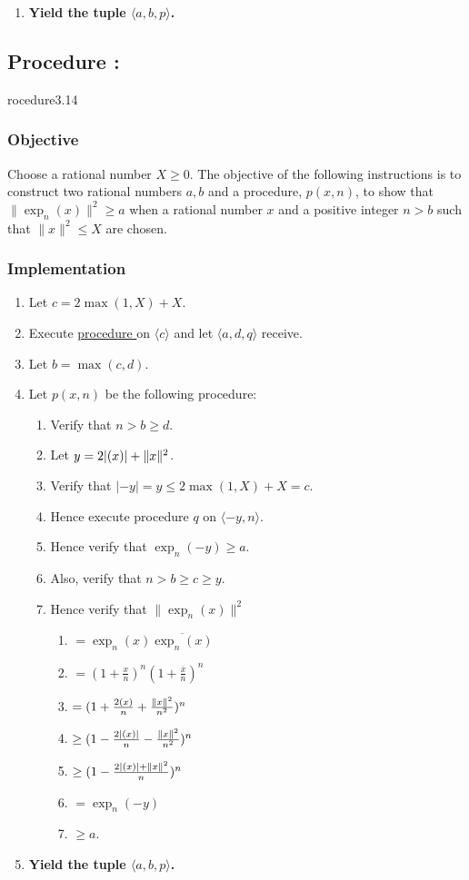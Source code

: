 \documentclass{article}
\let\Re\relax\DeclareMathOperator{\Re}{re}
\newcommand{\conj}[1]{\overline{#1}}
\newcounter{procedure}[part]
\newcommand{\procedure}[1]{\subsection*{Procedure \thepart:\theprocedure}\label{sec:procedure #1}\global\expandafter\edef\csname procedure#1\endcsname{\thepart:\theprocedure}\addtocounter{procedure}{1}}
\newcommand{\objective}{\subsubsection*{Objective}}
\newcommand{\implementation}{\subsubsection*{Implementation}}
\newcommand{\procedurehr}[1]{\hyperref[sec:procedure #1]{procedure \expandafter\csname procedure#1\endcsname}}
\begin{document}
\begin{multicols}{2}
\begin{enumerate}
\begin{enumerate}
					\end{enumerate}
					\item \textbf{Yield the tuple $\langle a,b,p\rangle$.}
				\end{enumerate}
		\procedure{3.14}
			\objective
				Choose a rational number $X\ge 0$. The objective of the following instructions is to construct two rational numbers $a,b$ and a procedure, $p(x,n)$, to show that $\lVert\exp_n(x)\rVert^2\ge a$ when a rational number $x$ and a positive integer $n>b$ such that $\lVert x\rVert^2\le X$ are chosen.
			\implementation
				\begin{enumerate}
					\item Let $c=2\max(1,X)+X$.
					\item Execute \procedurehr{3.12} on $\langle c\rangle$ and let $\langle a,d,q\rangle$ receive.
					\item Let $b=\max(c,d)$.
					\item Let $p(x,n)$ be the following procedure:
					\begin{enumerate}
						\item Verify that $n>b\ge d$.
						\item Let $y=2\lvert\Re(x)\rvert+\lVert x\rVert^2$.
						\item Verify that $\lvert -y\rvert=y\le 2\max(1,X)+X=c$.
						\item Hence execute procedure $q$ on $\langle -y,n\rangle$.
						\item Hence verify that $\exp_n(-y)\ge a$.
						\item Also, verify that $n>b\ge c\ge y$.
						\item Hence verify that $\lVert\exp_n(x)\rVert^2$
						\begin{enumerate}
							\item $=\exp_n(x)\conj{\exp_n(x)}$
							\item $=(1+\frac{x}{n})^n(1+\frac{\conj{x}}{n})^n$
							\item $=(1+\frac{2\Re(x)}{n}+\frac{\lVert x\rVert^2}{n^2})^n$
							\item $\ge(1-\frac{2\lvert\Re(x)\rvert}{n}-\frac{\lVert x\rVert^2}{n^2})^n$
							\item $\ge(1-\frac{2\lvert\Re(x)\rvert+\lVert x\rVert^2}{n})^n$
							\item $=\exp_n(-y)$
							\item $\ge a$.
						\end{enumerate}
					\end{enumerate}
					\item \textbf{Yield the tuple $\langle a,b,p\rangle$.}

\end{enumerate}
\end{multicols}
\end{document}
